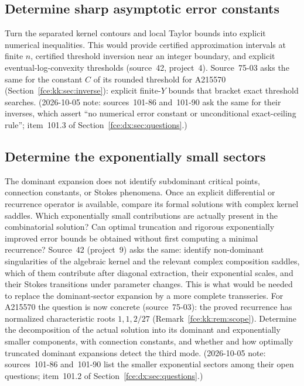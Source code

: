\documentclass[11pt,a4paper]{article}
\numberwithin{equation}{section}
\theoremstyle{definition}\newtheorem{definition}[theorem]{Definition}
\theoremstyle{remark}\newtheorem{remark}[theorem]{Remark}
\begin{document}
\subsection{Determine sharp asymptotic error constants}
Turn the separated kernel contours and local Taylor bounds into explicit
numerical inequalities. This would provide certified approximation
intervals at finite $n$, certified threshold inversion near an integer
boundary, and explicit eventual-log-convexity thresholds (source~42,
project~4). Source~75-03 asks the same for the constant $C$ of its rounded
threshold for A215570 (Section~\ref{fce:kk:sec:inverse}): explicit
finite-$Y$ bounds that bracket exact threshold searches. (2026-10-05 note: sources~101-86 and~101-90 ask the same for their inverses, which assert
``no numerical error constant or unconditional exact-ceiling rule''; item~101.3
of Section~\ref{fce:dx:sec:questions}.)

\subsection{Determine the exponentially small sectors}
The dominant expansion does not identify subdominant critical points,
connection constants, or Stokes phenomena. Once an explicit differential
or recurrence operator is available, compare its formal solutions with
complex kernel saddles. Which exponentially small contributions are
actually present in the combinatorial solution? Can optimal truncation
and rigorous exponentially improved error bounds be obtained without
first computing a minimal recurrence? Source~42 (project~9) asks the same:
identify non-dominant singularities of the algebraic kernel and the
relevant complex composition saddles, which of them contribute after
diagonal extraction, their exponential scales, and their Stokes
transitions under parameter changes. This is what would be needed to
replace the dominant-sector expansion by a more complete transseries.
For A215570 the question is now concrete (source~75-03): the proved
recurrence has normalized characteristic roots $1,1,2/27$
(Remark~\ref{fce:kk:rem:scope}). Determine the decomposition of the actual
solution into its dominant and exponentially smaller components, with
connection constants, and whether and how optimally truncated dominant
expansions detect the third mode. (2026-10-05 note: sources~101-86
and~101-90 list the smaller exponential sectors among their open questions;
item~101.2 of Section~\ref{fce:dx:sec:questions}.)
\end{document}
